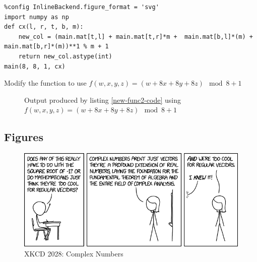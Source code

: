 \documentclass[11pt]{article}
\begin{document}
\begin{listing}[htbp]
\begin{verbatim}
%config InlineBackend.figure_format = 'svg'
import numpy as np
def cx(l, r, t, b, m):
    new_col = (main.mat[t,l] + main.mat[t,r]*m +  main.mat[b,l]*(m) + main.mat[b,r]*(m))**1 % m + 1
    return new_col.astype(int)
main(8, 8, 1, cx)
\end{verbatim}
\caption{\label{new-func2-code}Modify the function to use \(f(w,x,y,z) = (w + 8x + 8y + 8z) \mod 8 + 1\)}
\end{listing}


\begin{figure}[htbp]
\centering

\caption{\label{new-func2-plot}Output produced by listing \ref{new-func2-code} using \(f(w,x,y,z) = (w + 8x + 8y + 8z) \mod 8 + 1\)}
\end{figure}
\subsection{Figures}
\label{sec:org8d378d0}

\begin{figure}[htbp]
\centering
\includegraphics[width=.9\linewidth]{complex_numbers.png}
\caption{\label{xkcd-complex-numbers}XKCD 2028: Complex Numbers}
\end{figure}
\end{document}
